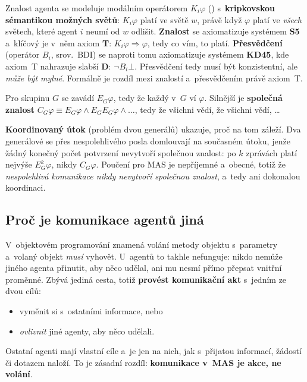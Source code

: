 \documentclass[11pt,a4paper]{article}
\theoremstyle{definition}
\begin{document}
\begin{defbox}
Znalost agenta se modeluje modálním operátorem $K_i\varphi$ () s~\textbf{kripkovskou sémantikou možných světů}: $K_i\varphi$ platí
ve světě $w$, právě když $\varphi$ platí ve \emph{všech} světech, které agent $i$
neumí od $w$ odlišit. \textbf{Znalost} se axiomatizuje systémem \textbf{S5} a~klíčový je v~něm
axiom \textbf{T}: $K_i\varphi \Rightarrow \varphi$, tedy co vím, to platí. \textbf{Přesvědčení}
(operátor $B_i$, srov.\ BDI) se naproti tomu axiomatizuje systémem \textbf{KD45}, kde axiom~T
nahrazuje slabší \textbf{D}: $\neg B_i\bot$. Přesvědčení tedy musí být konzistentní, ale
\emph{může být mylné}. Formálně je rozdíl mezi znalostí a~přesvědčením právě axiom~T.

Pro skupinu $G$ se zavádí $E_G\varphi$, tedy že každý v~$G$ ví $\varphi$. Silnější je
\textbf{společná znalost} $C_G\varphi \equiv E_G\varphi \wedge E_G E_G\varphi \wedge \dots$,
tedy že všichni vědí, že všichni vědí, \dots

\textbf{Koordinovaný útok} (problém dvou generálů) ukazuje, proč na tom záleží. Dva generálové
se přes nespolehlivého posla domlouvají na současném útoku, jenže žádný konečný počet potvrzení
nevytvoří společnou znalost: po $k$ zprávách platí nejvýše $E_G^k\varphi$, nikdy $C_G\varphi$.
Poučení pro MAS je nepříjemné a~obecné, totiž že \emph{nespolehlivá komunikace nikdy nevytvoří
společnou znalost}, a~tedy ani dokonalou koordinaci.
\end{defbox}

\subsection{Proč je komunikace agentů jiná}

V~objektovém programování znamená  volání metody objektu s~parametry a~volaný
objekt \emph{musí} vyhovět. U~agentů to takhle nefunguje: nikdo nemůže jiného agenta přinutit,
aby něco udělal, ani mu nesmí přímo přepsat vnitřní proměnné. Zbývá jediná cesta, totiž
\textbf{provést komunikační akt} s~jedním ze dvou cílů:
\begin{itemize}
\item vyměnit si s~ostatními informace, nebo
\item \emph{ovlivnit} jiné agenty, aby něco udělali.
\end{itemize}
Ostatní agenti mají vlastní cíle a~je jen na nich, jak s~přijatou informací, žádostí či dotazem
naloží. To je zásadní rozdíl: \textbf{komunikace v~MAS je akce, ne volání}.
\end{document}
